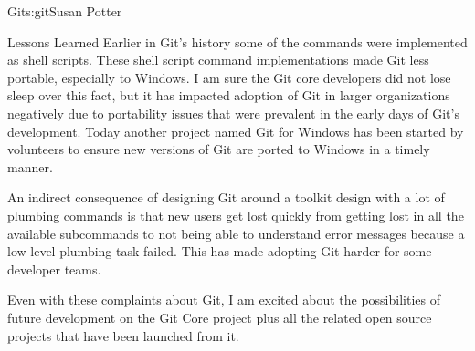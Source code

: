 \begin{aosachapter}{Git}{s:git}{Susan Potter}
\begin{aosasect1}{Lessons Learned}
Earlier in Git's history some of the commands were implemented as shell
scripts. These shell script command implementations made Git less portable,
especially to Windows. I am sure the Git core developers did not lose sleep
over this fact, but it has impacted adoption of Git in larger organizations
negatively due to portability issues that were prevalent in the early days
of Git's development. Today another project named Git for Windows has been
started by volunteers to ensure new versions of Git are ported to Windows in
a timely manner.

An indirect consequence of designing Git around a toolkit design
with a lot of plumbing commands is that new users get lost quickly from
getting lost in all the available subcommands to not being able to
understand error messages because a low level plumbing task failed. This
has made adopting Git harder for some developer teams.

Even with these complaints about Git, I am excited about the possibilities
of future development on the Git Core project plus all the related open
source projects that have been launched from it.

\end{aosasect1}

\end{aosachapter}

